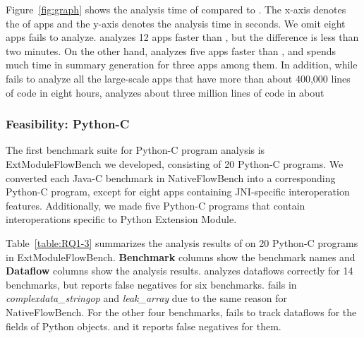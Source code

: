 Figure~\ref{fig:graph} shows the analysis time of \ours compared to \lees.
The x-axis denotes the  of apps and the y-axis denotes the analysis time
in seconds. We omit eight apps \lees fails to analyze.
\lees analyzes 12 apps faster than \ours, but the difference is less than two
minutes. 
On the other hand, \ours analyzes five apps faster than \lees, and \lees spends
much time in summary generation for three apps among them. 
In addition, while \lees fails to analyze all the large-scale apps that have
more than about 400,000 lines of code in eight hours, \ours analyzes about
three million lines of code in about 

\subsubsection{Feasibility: Python-C}


The first benchmark suite for Python-C program analysis is ExtModuleFlowBench we developed,
consisting of 20 Python-C programs.
We converted each Java-C benchmark in NativeFlowBench into a
corresponding Python-C program, except for eight apps containing JNI-specific interoperation
features. Additionally, we made five Python-C programs that contain interoperations
specific to Python Extension Module.

Table~\ref{table:RQ1-3} summarizes the analysis results of \ours
on 20 Python-C programs in ExtModuleFlowBench.
{\bf Benchmark} columns show the benchmark names and {\bf Dataflow}
columns show the analysis results.
\ours analyzes dataflows correctly for 14 benchmarks, but reports false
negatives for six benchmarks.
\ours fails in {\it complexdata\_stringop} and {\it leak\_array} due to the
same reason for NativeFlowBench.
For the other four benchmarks, \ours fails to track dataflows for the fields of Python objects. 
 and it
reports false negatives for them.

